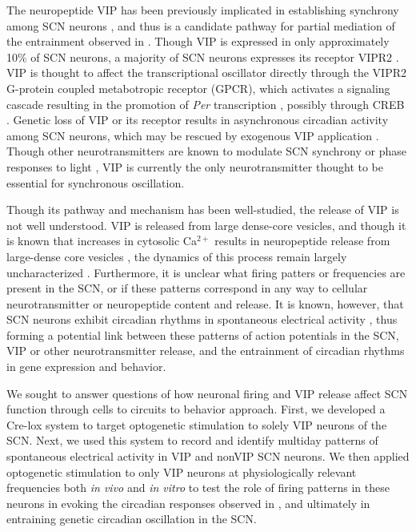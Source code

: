 The neuropeptide VIP has been previously implicated in establishing synchrony among SCN neurons \cite{Aton2005, Maywood2006, Brown2007}, and thus is a candidate pathway for partial mediation of the entrainment observed in \cite{Jones2015}.
Though VIP is expressed in only approximately 10\% of SCN neurons, a majority of SCN neurons expresses its receptor VIPR2 \cite{An2012}.
VIP is thought to affect the transcriptional oscillator directly through the VIPR2 G-protein coupled metabotropic receptor (GPCR), which activates a signaling cascade resulting in the promotion of \textit{Per} transcription \cite{ Travnickova2002, Liu2007a}, possibly through CREB \cite{Maywood2007, To2007, Liu2007a}.
Genetic loss of VIP or its receptor results in asynchronous circadian activity among SCN neurons, which may be rescued by exogenous VIP application \cite{Aton2005}.
Though other neurotransmitters are known to modulate SCN synchrony or phase responses to light \cite{Mieda2015, Myung2015}, VIP is currently the only neurotransmitter thought to be essential for synchronous oscillation.

Though its pathway and mechanism has been well-studied, the release of VIP is not well understood.
VIP is released from large dense-core vesicles, and though it is known that increases in cytosolic Ca$^{2+}$ results in neuropeptide release from large-dense core vesicles \cite{Verhage1991}, the dynamics of this process remain largely uncharacterized \cite{Salio2006}.
Furthermore, it is unclear what firing patters or frequencies are present in the SCN, or if these patterns correspond in any way to cellular neurotransmitter or neuropeptide content and release.
It is known, however, that SCN neurons exhibit circadian rhythms in spontaneous electrical activity \cite{Herzog1998}, thus forming a potential link between these patterns of action potentials in the SCN, VIP or other neurotransmitter release, and the entrainment of circadian rhythms in gene expression and behavior.


We sought to answer questions of how neuronal firing and VIP release affect SCN function through cells to circuits to behavior approach.
First, we developed a Cre-lox system to target optogenetic stimulation to solely VIP neurons of the SCN.
Next, we used this system to record and identify multiday patterns of spontaneous electrical activity in VIP and nonVIP SCN neurons.
We then applied optogenetic stimulation to only VIP neurons at physiologically relevant frequencies both \textit{in vivo} and \textit{in vitro} to test the role of firing patterns in these neurons in evoking the circadian responses observed in \cite{Jones2015}, and ultimately in entraining genetic circadian oscillation in the SCN.


